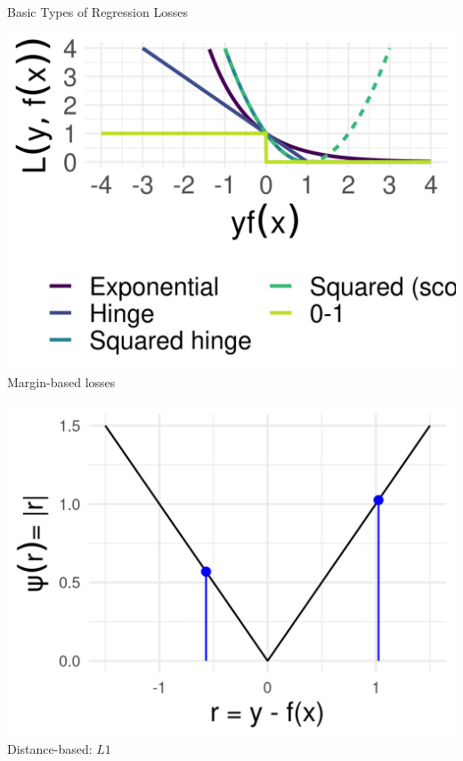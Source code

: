 \begin{vbframe}{Basic Types of Regression Losses}
\begin{minipage}[b]{0.25\textwidth}
  \includegraphics[width=\textwidth]{figure/plot_loss_overview_classif_2}
  \tiny \centering
  Margin-based losses
\end{minipage}%
\begin{minipage}[b]{0.25\textwidth}
  \includegraphics[width=\textwidth]{figure/loss_dist_based}
  \tiny \centering
  Distance-based: $L1$
\end{minipage}%
\begin{minipage}[b]{0.2\textwidth}

\end{minipage}
\end{vbframe}
